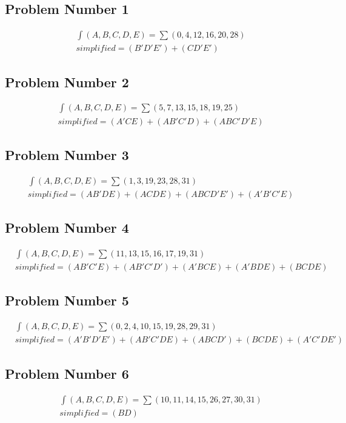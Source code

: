 \subsection{Problem Number 1}
\begin{align}
\nonumber
&\int(A,B,C,D,E) = \sum(0,4,12,16,20,28) \\
\nonumber
&simplified = (B'D'E')+(CD'E')
\end{align}

\subsection{Problem Number 2}
\begin{align}
\nonumber
&\int(A,B,C,D,E) = \sum(5,7,13,15,18,19,25) \\
\nonumber
&simplified = (A'CE)+(AB'C'D)+(ABC'D'E)
\end{align}

\subsection{Problem Number 3}
\begin{align}
\nonumber
&\int(A,B,C,D,E) = \sum(1,3,19,23,28,31) \\
\nonumber
&simplified = (AB'DE)+(ACDE)+(ABCD'E')+(A'B'C'E)
\end{align}

\subsection{Problem Number 4}
\begin{align}
\nonumber
&\int(A,B,C,D,E) = \sum(11,13,15,16,17,19,31) \\
\nonumber
&simplified = (AB'C'E)+(AB'C'D')+(A'BCE)+(A'BDE)+(BCDE)
\end{align}

\subsection{Problem Number 5}
\begin{align}
\nonumber
&\int(A,B,C,D,E) = \sum(0,2,4,10,15,19,28,29,31) \\
\nonumber
&simplified = (A'B'D'E')+(AB'C'DE)+(ABCD')+(BCDE)+(A'C'DE')
\end{align}

\subsection{Problem Number 6}
\begin{align}
\nonumber
&\int(A,B,C,D,E) = \sum(10,11,14,15,26,27,30,31) \\
\nonumber
&simplified = (BD)
\end{align}

